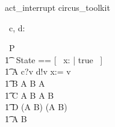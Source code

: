 \begin{zsection}
   \SECTION act\_interrupt \parents circus\_toolkit
\end{zsection}

\begin{circus}
   \circchannel\ c, d: \nat
\end{circus}

\begin{circus}
    \circprocess\ P \circdef \circbegin \\
    	\t1 \circstate\ State == [~ x: \nat | true ~] \\
        \t1 A \circdef c?v \then d!v \then x:= v \\
        \t1 B \circdef A \circinterrupt B \extchoice A \\
        \t1 C \circdef A \circinterrupt B \circseq A \circinterrupt B \\
        \t1 D \circdef (A \circinterrupt B) \circseq (A \circinterrupt B) \\
        \t1 \circspot A \circinterrupt B\\
    \circend
\end{circus}

